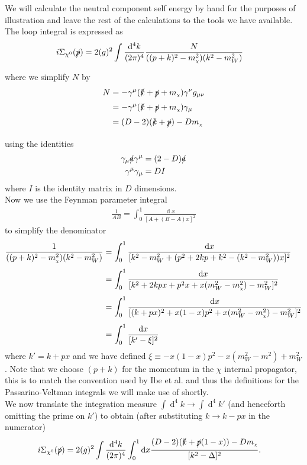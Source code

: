 \documentclass[11pt]{article}
\newcommand{\mychi}{\raisebox{0pt}[1ex][1ex]{\tiny$\chi$}}
\def\sp{\slashed{p}}
\def\sk{\slashed{k}}
\def\cn{\chi^0}
\def\gm{\gamma^{\mu}}
\def\gn{\gamma^{\nu}}
\renewcommand{\d}{\ensuremath{\operatorname{d}\!}}
\def\mc{m_{\mychi}}
\begin{document}
We will calculate the neutral component self energy by hand for the purposes of illustration and leave the rest of the calculations to the tools we have available.  The loop integral is expressed as
\begin{align}
i\Sigma_{\cn}(\slashed{p})&=2 (g)^2 \int \frac{\d^4k}{(2\pi)^4} \frac{N}{((p+k)^2-\mc^2)(k^2-m_W^2)}
\end{align}
where we simplify $N$ by
\begin{align*}
N&=-\gm(\sk+\sp+\mc)\gn g_{\mu\nu}\\
&=-\gm(\sk+\sp+\mc)\gamma_{\mu}\\
&=(D-2)(\sk+\sp)-D\mc
\end{align*}

using the identities
\begin{align}
\begin{split}
\gamma_{\mu}\slashed{a}\gm&=(2-D)\slashed{a}\\
\gm\gamma_{\mu}&=DI
\end{split}
\end{align}
where $I$ is the identity matrix in $D$ dimensions.\\

Now we use the Feynman parameter integral
\begin{align}
\frac{1}{AB}=\int_0^1 \frac{\d x}{[A+(B-A)x]^2}
\end{align}
to simplify the denominator
\begin{align*}
 \frac{1}{((p+k)^2-\mc^2)(k^2-m_W^2)}&=\int_0^1\frac{\d x}{[k^2-m_W^2+(p^2+2kp+k^2-(k^2-m_W^2))x]^2}\\
&=\int_0^1\frac{\d x}{[ k^2+2kpx+p^2x+x(m_W^2-\mc^2)-m_W^2]^2}\\
&=\int_0^1\frac{\d x}{[ (k+px)^2+x(1-x)p^2+x(m_W^2-\mc^2)-m_W^2]^2}\\
&=\int_0^1\frac{\d x}{[ k'-\xi]^2}
\end{align*}
where $k'=k+px$ and we have defined $\xi\equiv-x(1-x)p^2-x(m_W^2-m^2)+m_W^2$.  Note that we choose $(p+k)$ for the momentum in the $\chi$ internal propagator, this is to match the convention used by Ibe et al. \cite{Ibe2013a} and thus the definitions for the Passarino-Veltman integrals we will make use of shortly.\\


We now translate the integration measure $\int \d^4k\rightarrow\int \d^4k'$ (and henceforth omitting the prime on $k'$) to obtain (after substituting $k\rightarrow k-px$ in the numerator)
\begin{align}
i\Sigma_{\cn}(\slashed{p})&= 2(g)^2 \int \frac{\d^4k}{(2\pi)^4}\int_0^1 \d x \frac{(D-2)(\sk+\sp(1-x) )-D\mc}{[ k^2-\Delta]^2}.
\end{align}
\end{document}

